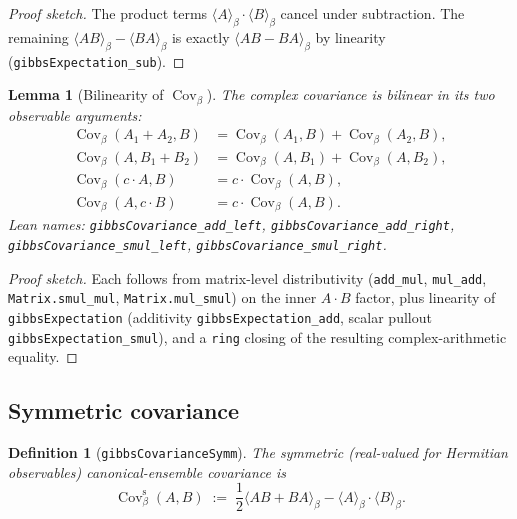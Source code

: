 \documentclass[a4paper,11pt]{article}
\newtheorem{lemma}[theorem]{Lemma}
\newtheorem{definition}[theorem]{Definition}
\begin{document}
\begin{proof}[Proof sketch]
The product terms $\langle A \rangle_\beta \cdot \langle B \rangle_\beta$
cancel under subtraction.  The remaining
$\langle A B \rangle_\beta - \langle B A \rangle_\beta$ is exactly
$\langle A B - B A \rangle_\beta$ by linearity
(\texttt{gibbsExpectation\_sub}).
\end{proof}

\begin{lemma}[Bilinearity of $\operatorname{Cov}_\beta$]
The complex covariance is bilinear in its two observable arguments:
\begin{align*}
\operatorname{Cov}_\beta(A_1 + A_2, B) &= \operatorname{Cov}_\beta(A_1, B) + \operatorname{Cov}_\beta(A_2, B), \\
\operatorname{Cov}_\beta(A, B_1 + B_2) &= \operatorname{Cov}_\beta(A, B_1) + \operatorname{Cov}_\beta(A, B_2), \\
\operatorname{Cov}_\beta(c \cdot A, B) &= c \cdot \operatorname{Cov}_\beta(A, B), \\
\operatorname{Cov}_\beta(A, c \cdot B) &= c \cdot \operatorname{Cov}_\beta(A, B).
\end{align*}
Lean names: \texttt{gibbsCovariance\_add\_left},
\texttt{gibbsCovariance\_add\_right},
\texttt{gibbsCovariance\_smul\_left},
\texttt{gibbsCovariance\_smul\_right}.
\end{lemma}

\begin{proof}[Proof sketch]
Each follows from matrix-level distributivity (\texttt{add\_mul},
\texttt{mul\_add}, \texttt{Matrix.smul\_mul}, \texttt{Matrix.mul\_smul})
on the inner $A \cdot B$ factor, plus linearity of
\texttt{gibbsExpectation} (additivity \texttt{gibbsExpectation\_add},
scalar pullout \texttt{gibbsExpectation\_smul}), and a
\texttt{ring} closing of the resulting complex-arithmetic equality.
\end{proof}

\subsection{Symmetric covariance}
\label{subsec:gibbs-covariance-symm}

\begin{definition}[\texttt{gibbsCovarianceSymm}]
The symmetric (real-valued for Hermitian observables)
canonical-ensemble covariance is
\[
  \operatorname{Cov}^{\mathrm{s}}_\beta(A, B)
  \;:=\;
  \frac{1}{2} \langle A B + B A \rangle_\beta
  - \langle A \rangle_\beta \cdot \langle B \rangle_\beta.
\]
\end{definition}
\end{document}

